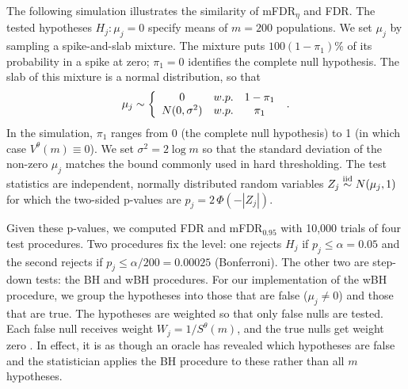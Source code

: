 \documentclass[12pt]{article}
\newcommand{\iid}{\stackrel {\mbox{\scriptsize iid}}{\sim}}
\newcommand{\al}{\alpha}
\begin{document}
The following simulation illustrates the similarity of mFDR$_{\eta}$ and FDR. 
The tested hypotheses $H_j: \mu_j = 0$ specify means
 of $m=200$ populations.  We set $\mu_j$ by
 sampling a spike-and-slab mixture.  The mixture puts $100(1-\pi_1)$\%
 of its probability in a spike at zero; $\pi_1=0$ identifies the
complete null hypothesis.  The slab of this mixture is a normal
distribution, so that
\begin{equation}
   \mu_j \sim \left\{  \begin{array}{ccc}
                   0  &  w.p.  & 1-\pi_1 \cr
                   N(0,\sigma^2) & w.p. & \pi_1 
    \end{array} \right.  \;.
\label{eq:mu-j}
\end{equation}
 In the simulation,  $\pi_1$ ranges from 0 (the
complete null hypothesis) to 1 (in which case $V^{\theta}(m) \equiv 0$).
We set $\sigma^2 = 2 \log m$ so that the standard deviation of the non-zero
$\mu_j$ matches the bound commonly used in hard thresholding.  The
test statistics are independent, normally distributed random variables
$Z_j \iid N(\mu_j,1)$ for which the two-sided p-values are $p_j =
2\,\Phi(-|Z_j|)$.  

Given these p-values, we computed FDR and
mFDR$_{0.95}$ with 10,000 trials of four test procedures.  Two procedures fix the level: one rejects $H_j$ if $p_j \le  \al=0.05$ and the second rejects if $p_j \le  \al/200=0.00025$ (Bonferroni). The other two are step-down tests: the BH and wBH procedures.  For our implementation of the wBH procedure, we group the hypotheses into those that are false ($\mu_j \ne 0$) and those that are true. The hypotheses are weighted so that only false nulls are tested. Each false null receives weight $W_j = 1/S^\theta(m)$, and the true nulls get weight zero \citep[see section 3 of][]{wasserman06}. In effect, it is as though an oracle has revealed which hypotheses are false and the statistician applies the BH procedure to these rather than all $m$ hypotheses. 
\end{document}
